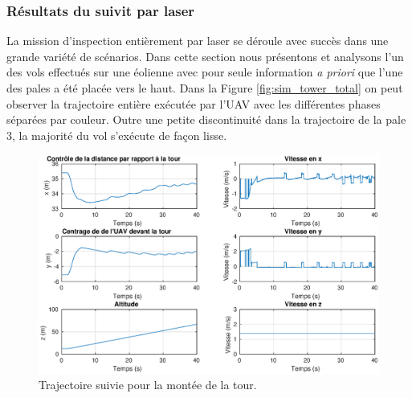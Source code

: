 \subsubsection{Résultats du suivit par laser}

La mission d'inspection entièrement par laser se déroule avec succès dans une grande variété de scénarios. Dans cette section nous présentons et analysons l'un des vols effectués sur une éolienne avec pour seule information \textit{a priori} que l'une des pales a été placée vers le haut. Dans la Figure \ref{fig:sim_tower_total} on peut observer la trajectoire entière exécutée par l'UAV avec les différentes phases séparées par couleur. Outre une petite discontinuité dans la trajectoire de la pale 3, la majorité du vol s'exécute de façon lisse.
\begin{figure}[!htb]
  \centering
  \includegraphics[width=\linewidth]{images/sim_tower_ascent}
  \caption{Trajectoire suivie pour la montée de la tour.}
  \label{fig:sim_tower_ascent}
\end{figure}

